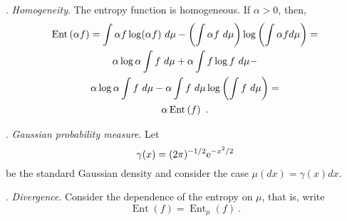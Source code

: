 \documentclass[12pt,a4paper]{amsart}
\renewcommand{\entropyof}[1]{\operatorname{Ent}\left(#1\right)}
\newcommand{\entropyat}[2]{\operatorname{Ent}_{#1}\left(#2\right)}
\begin{document}
. \emph{Homogeneity}. The entropy function is homogeneous. If $\alpha
> 0$, then,
\begin{multline*}
  \entropyof{\alpha f} = \int \alpha f \log (\alpha f) \ d\mu - \left(\int
    \alpha f \ d\mu\right) \logof{\int \alpha f  d\mu} = \\
  \alpha \log \alpha \int f \ d\mu + \alpha \int f \log f \ d\mu - \\
  \alpha \log \alpha \int f \ d\mu - \alpha \int f \ d\mu \logof{\int
    f \ d\mu} = \\ \alpha \entropyof f \ .
\end{multline*}

. \emph{Gaussian probability measure}. Let
\begin{equation*}
  \gamma(x) = (2\pi)^{-1/2} \mathrm{e}^{-x^2/2}
\end{equation*}
be the standard Gaussian density and consider the case $\mu(dx) =
\gamma(x) dx$.

. \emph{Divergence}. Consider the dependence of the entropy on $\mu$, that is, write
\begin{equation*}
    \entropyof f = \entropyat \mu f \ .
\end{equation*}
\end{document}

